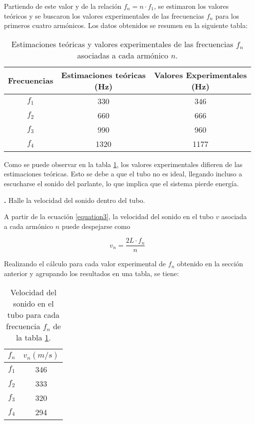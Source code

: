 \documentclass[12pt, a4paper]{article}
\newcounter{step}
\newcommand{\step}[1]
{
  \par\vspace{2ex}
  \stepcounter{step}
  \noindent\textbf{\arabic{step}.} #1\par\vspace{1ex}
}
\begin{document}
Partiendo de este valor y de la relación $f_{n}=n\cdot f_{1}$, se estimaron los valores teóricos y se buscaron los valores experimentales de las frecuencias $f_{n}$ para los primeros cuatro armónicos. Los datos obtenidos se resumen en la siguiente tabla:

\begin{table}[H]
  \centering
  \begin{tabular}{|c|c|c|}
  \hline
  Frecuencias & Estimaciones teóricas (Hz) & Valores Experimentales (Hz)\\
  \hline
  $f_1$  & 330  & 346 \\ \hline
  $f_2$  & 660 & 666 \\ \hline
  $f_3$  & 990 & 960 \\ \hline
  $f_4$  & 1320  & 1177 \\ \hline
  \end{tabular}
  \caption{\centering Estimaciones teóricas y valores experimentales de las frecuencias $f_{n}$ asociadas a cada armónico $n$.}
  \label{tabla1}
\end{table}

Como se puede observar en la tabla \ref{tabla1}, los valores experimentales difieren de las estimaciones teóricas. Esto se debe a que el tubo no es ideal, llegando incluso a escucharse el sonido del parlante, lo que implica que el sistema pierde energía.


\step{Halle la velocidad del sonido dentro del tubo.}

A partir de la ecuación \ref{equation3}, la velocidad del sonido en el tubo $v$ asociada a cada armónico $n$ puede despejarse como

\begin{equation}
  v_{n} = \frac{2L \cdot f_{n}}{n}
  \label{equation4}
\end{equation}

Realizando el cálculo para cada valor experimental de $f_{n}$ obtenido en la sección anterior y agrupando los resultados en una tabla, se tiene:

\begin{table}[H]
    \centering
    \begin{tabular}{|c|c|}
    \hline
    \multirow{1}{2.1cm}{\centering $f_n$} 
        & $v_{n} (m/s)$ \\
    \hline
    $f_1$  & 346 \\ \hline
    $f_2$  & 333 \\ \hline
    $f_3$  & 320 \\ \hline
    $f_4$  & 294  \\ \hline
    \end{tabular}
    \caption{Velocidad del sonido en el tubo para cada frecuencia $f_{n}$ de la tabla \ref{tabla1}.}
    \label{tabla2}
\end{table}
\end{document}
